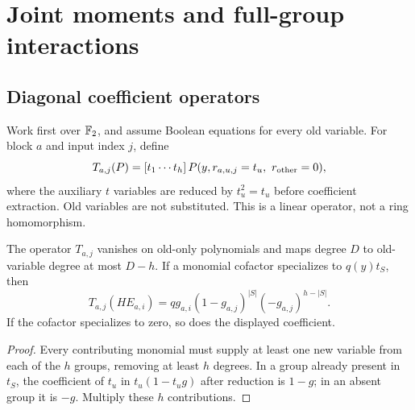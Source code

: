 \chapter{Joint moments and full-group interactions}\label{ch:moments}

\section{Diagonal coefficient operators}
Work first over $\mathbb F_2$, and assume Boolean equations for every old variable. For block $a$ and input index $j$, define
\[
 T_{a,j}(P)=[t_1\cdots t_h]\,
 P(y,r_{a,u,j}=t_u,\ r_{\rm other}=0),
\]
where the auxiliary $t$ variables are reduced by $t_u^2=t_u$ before coefficient extraction. Old variables are not substituted. This is a linear operator, not a ring homomorphism.

\begin{lemma}\label{lem:coefficient}
The operator $T_{a,j}$ vanishes on old-only polynomials and maps degree $D$ to old-variable degree at most $D-h$. If a monomial cofactor specializes to $q(y)t_S$, then
\[
 T_{a,j}(HE_{a,i})=
 qg_{a,i}(1-g_{a,j})^{|S|}(-g_{a,j})^{h-|S|}.
\]
If the cofactor specializes to zero, so does the displayed coefficient.
\end{lemma}
\begin{proof}
Every contributing monomial must supply at least one new variable from each of the $h$ groups, removing at least $h$ degrees. In a group already present in $t_S$, the coefficient of $t_u$ in $t_u(1-t_ug)$ after reduction is $1-g$; in an absent group it is $-g$. Multiply these $h$ contributions.
\end{proof}

